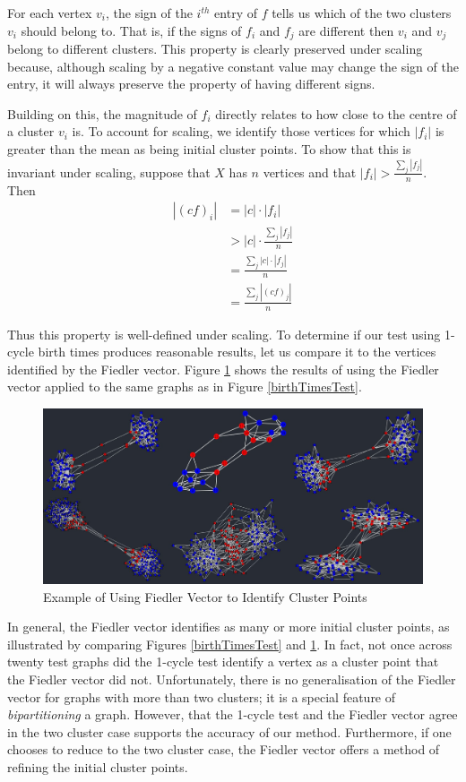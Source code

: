 \documentclass[12pt,a4paper]{amsart}
\numberwithin{equation}{section}
\theoremstyle{plain}
\theoremstyle{definition}
\begin{document}
For each vertex $v_i$, the sign of the $i^{th}$ entry of $f$ tells us which of the two clusters $v_i$ should belong to. That is, if the signs of $f_i$ and $f_j$ are different then $v_i$ and $v_j$ belong to different clusters. This property is clearly preserved under scaling because, although scaling by a negative constant value may change the sign of the entry, it will always preserve the property of having different signs.

Building on this, the magnitude of $f_i$ directly relates to how close to the centre of a cluster $v_i$ is. To account for scaling, we identify those vertices for which $|f_i|$ is greater than the mean as being initial cluster points. To show that this is invariant under scaling, suppose that $X$ has $n$ vertices and that $|f_i| > \frac{\sum_j |f_j|}{n}$. Then
\begin{align*}
|(cf)_i| &= |c| \cdot |f_i| \\
&> |c| \cdot \frac{\sum_j |f_j|}{n} \\
&= \frac{\sum_j|c| \cdot |f_j|}{n} \\
&= \frac{\sum_j |(cf)_j|}{n}
\end{align*}

Thus this property is well-defined under scaling. To determine if our test using 1-cycle birth times produces reasonable results, let us compare it to the vertices identified by the Fiedler vector. Figure \ref{fiedlerTest} shows the results of using the Fiedler vector applied to the same graphs as in Figure \ref{birthTimesTest}. 

\begin{figure}[h]
	\centering
	\includegraphics[scale=0.55]{FiedlerClusterPoints.jpg}
	\caption{Example of Using Fiedler Vector to Identify Cluster Points}
	\label{fiedlerTest}
\end{figure}

\newpage

In general, the Fiedler vector identifies as many or more initial cluster points, as illustrated by comparing Figures \ref{birthTimesTest} and \ref{fiedlerTest}. In fact, not once across twenty test graphs did the 1-cycle test identify a vertex as a cluster point that the Fiedler vector did not. Unfortunately, there is no generalisation of the Fiedler vector for graphs with more than two clusters; it is a special feature of \textit{bipartitioning} a graph. However, that the 1-cycle test and the Fiedler vector agree in the two cluster case supports the accuracy of our method. Furthermore, if one chooses to reduce to the two cluster case, the Fiedler vector offers a method of refining the initial cluster points.
\end{document}
